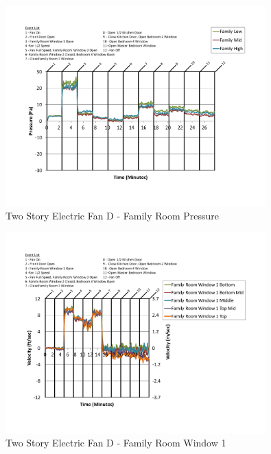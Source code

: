 \documentclass{article}
\begin{document}
\begin{appendices}
	\begin{figure}[H]
		\centering
		\includegraphics[height=3.05in,trim=0.67in 1.1in 0.67in 0.8in,clip=true]{0_Images/Results_Charts/ColdFlow/Two_Story/Electric/D/Family_Room_Pressure.pdf}
		\caption{Two Story Electric Fan D - Family Room Pressure}
	\end{figure}
 

	\begin{figure}[H]
		\centering
		\includegraphics[height=3.05in,trim=0.67in 1.1in 0.67in 0.8in,clip=true]{0_Images/Results_Charts/ColdFlow/Two_Story/Electric/D/Family_Room_Window_1.pdf}
		\caption{Two Story Electric Fan D - Family Room Window 1}
	\end{figure}
 
	\clearpage


\end{appendices}
\end{document}
